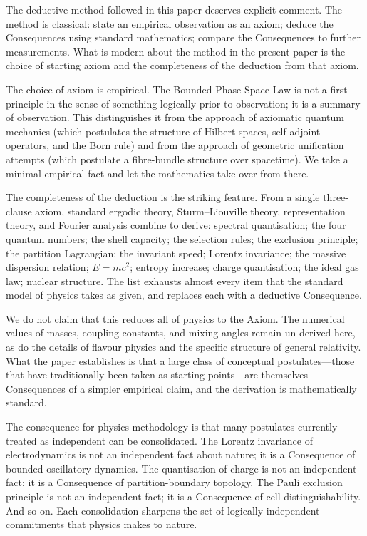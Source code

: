\documentclass[11pt,twocolumn,a4paper]{article}
\theoremstyle{axiomstyle}
\theoremstyle{conseqstyle}
\theoremstyle{definition}
\theoremstyle{remark}
\begin{document}
The deductive method followed in this paper deserves explicit comment. The method is classical: state an empirical observation as an axiom; deduce the Consequences using standard mathematics; compare the Consequences to further measurements. What is modern about the method in the present paper is the choice of starting axiom and the completeness of the deduction from that axiom.

The choice of axiom is empirical. The Bounded Phase Space Law is not a first principle in the sense of something logically prior to observation; it is a summary of observation. This distinguishes it from the approach of axiomatic quantum mechanics (which postulates the structure of Hilbert spaces, self-adjoint operators, and the Born rule) and from the approach of geometric unification attempts (which postulate a fibre-bundle structure over spacetime). We take a minimal empirical fact and let the mathematics take over from there.

The completeness of the deduction is the striking feature. From a single three-clause axiom, standard ergodic theory, Sturm--Liouville theory, representation theory, and Fourier analysis combine to derive: spectral quantisation; the four quantum numbers; the shell capacity; the selection rules; the exclusion principle; the partition Lagrangian; the invariant speed; Lorentz invariance; the massive dispersion relation; $E=mc^{2}$; entropy increase; charge quantisation; the ideal gas law; nuclear structure. The list exhausts almost every item that the standard model of physics takes as given, and replaces each with a deductive Consequence.

We do not claim that this reduces all of physics to the Axiom. The numerical values of masses, coupling constants, and mixing angles remain un-derived here, as do the details of flavour physics and the specific structure of general relativity. What the paper establishes is that a large class of conceptual postulates---those that have traditionally been taken as starting points---are themselves Consequences of a simpler empirical claim, and the derivation is mathematically standard.

The consequence for physics methodology is that many postulates currently treated as independent can be consolidated. The Lorentz invariance of electrodynamics is not an independent fact about nature; it is a Consequence of bounded oscillatory dynamics. The quantisation of charge is not an independent fact; it is a Consequence of partition-boundary topology. The Pauli exclusion principle is not an independent fact; it is a Consequence of cell distinguishability. And so on. Each consolidation sharpens the set of logically independent commitments that physics makes to nature.
\end{document}
